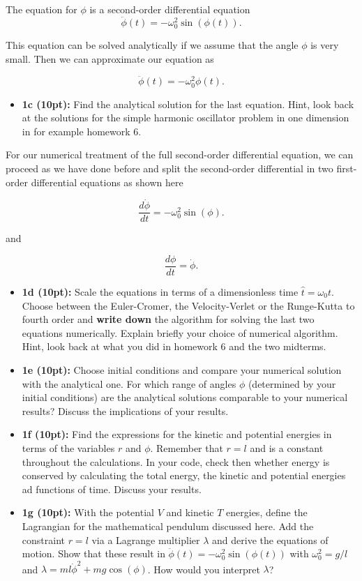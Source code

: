 \documentclass[%
oneside,                 %
final,                   %
10pt]{article}
\begin{document}
\noindent
The equation for $\phi$ is a second-order differential equation
\[
\ddot{\phi}(t)=-\omega_0^2\sin{(\phi(t))}.
\]

This equation can be solved analytically if we assume that the angle $\phi$ is very small. Then we can approximate our equation as

\[
\ddot{\phi}(t)=-\omega_0^2\phi(t).
\]

\begin{itemize}
\item \textbf{1c (10pt):} Find the analytical solution for the last equation. Hint, look back at the solutions for the simple harmonic oscillator problem in one dimension in for example homework 6.
\end{itemize}

\noindent
For our numerical treatment of the full second-order differential  equation, we can proceed as we have done before and split the second-order differential in two first-order differential equations
as shown here

\[
\frac{d\dot{\phi}}{dt}=-\omega_0^2\sin{(\phi)}.
\]

and

\[
\frac{d\phi}{dt}=\dot{\phi}.
\]


\begin{itemize}
\item \textbf{1d (10pt):} Scale the equations in terms of a dimensionless time $\hat{t}=\omega_0t$. Choose between the Euler-Cromer, the Velocity-Verlet or the Runge-Kutta to fourth order and \textbf{write down} the algorithm for solving the last two equations numerically. Explain briefly your choice of numerical algorithm. Hint, look back at what you did in homework 6 and the two midterms.

\item \textbf{1e (10pt):} Choose initial conditions and compare your numerical solution with the analytical one. For which range of angles $\phi$ (determined by your initial conditions) are the analytical solutions comparable to your numerical results? Discuss the implications of your results.

\item \textbf{1f (10pt):} Find the expressions for the kinetic and potential energies in terms of the variables $r$ and $\phi$. Remember that $r=l$ and is a constant throughout the calculations. In your code, check then whether energy is conserved by calculating the total energy, the kinetic and potential energies ad functions of time. Discuss your results.

\item \textbf{1g (10pt):} With the potential $V$  and kinetic $T$ energies, define the Lagrangian for the mathematical pendulum discussed here. Add the constraint $r=l$ via a Lagrange multiplier $\lambda$ and derive the equations of motion. Show that these result in  $\ddot{\phi}(t)=-\omega_0^2\sin{(\phi(t))}$ with $\omega_0^2=g/l$ and $\lambda=ml\dot{\phi}^2+mg\cos{(\phi)}$.  How would you interpret $\lambda$? 
\end{itemize}
\end{document}
